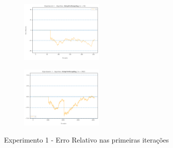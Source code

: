 \begin{figure}
  \centering
  \captionsetup{justification=centering,margin=2cm}
  \begin{subfigure}{.5\textwidth}
    \centering
    \includegraphics[width=\linewidth, height=3cm]{figuras/adaptive_sampling_erro_first_64.png}
  \end{subfigure}%
  \begin{subfigure}{.5\textwidth}
    \centering
    \includegraphics[width=\linewidth, height=3cm]{figuras/adaptive_sampling_erro_first_1024.png}
  \end{subfigure}
  \caption{Experimento 1 - Erro Relativo nas primeiras iterações}
  \label{fig:as:experimento:01:erro:first}
\end{figure}

